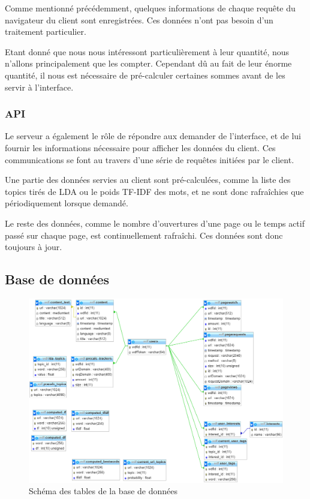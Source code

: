 				Comme mentionné précédemment, quelques informations de chaque requête du navigateur du client sont enregistrées. Ces données n'ont pas besoin d'un traitement particulier.

				Etant donné que nous nous intéressont particulièrement à leur quantité, nous n'allons principalement que les compter. Cependant dû au fait de leur énorme quantité, il nous est nécessaire de pré-calculer certaines sommes avant de les servir à l'interface.

		\subsubsection{API}

			Le serveur a également le rôle de répondre aux demander de l'interface, et de lui fournir les informations nécessaire pour afficher les données du client. Ces communications se font au travers d'une série de requêtes initiées par le client.

			Une partie des données servies au client sont pré-calculées, comme la liste des topics tirés de LDA ou le poids TF-IDF des mots, et ne sont donc rafraîchies que périodiquement lorsque demandé.

			Le reste des données, comme le nombre d'ouvertures d'une page ou le temps actif passé sur chaque page, est continuellement rafraîchi. Ces données sont donc toujours à jour.

	\subsection{Base de données}

		\begin{figure}[!h]
			\centering
			\includegraphics[height=0.8\textwidth]{images/design/db}
			\caption{Schéma des tables de la base de données}
			\label{db}
		\end{figure}

